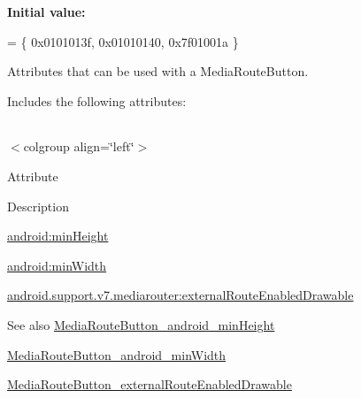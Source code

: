 {\bfseries Initial value\+:}
\begin{DoxyCode}
= \{
            0x0101013f, 0x01010140, 0x7f01001a
        \}
\end{DoxyCode}
Attributes that can be used with a Media\+Route\+Button. 

Includes the following attributes\+:

\tabulinesep=1mm
\begin{longtabu} spread 0pt [c]{*{0}{|X[-1]}|}
\hline
\end{longtabu}
$<$colgroup align=\char`\"{}left\char`\"{}$>$ 

Attribute

Description 

{\ttfamily \hyperlink{classandroid_1_1support_1_1v7_1_1mediarouter_1_1R_1_1styleable_ab98a55579c58d4c98bfd327310ce9a31}{android\+:min\+Height}}

{\ttfamily \hyperlink{classandroid_1_1support_1_1v7_1_1mediarouter_1_1R_1_1styleable_ab6856ae1a9a085cb912367dfb497084e}{android\+:min\+Width}}

{\ttfamily \hyperlink{classandroid_1_1support_1_1v7_1_1mediarouter_1_1R_1_1styleable_afdeb168461403af3e2f9cfe441938c4c}{android.\+support.\+v7.\+mediarouter\+:external\+Route\+Enabled\+Drawable}}

\begin{DoxySeeAlso}{See also}
\hyperlink{classandroid_1_1support_1_1v7_1_1mediarouter_1_1R_1_1styleable_ab98a55579c58d4c98bfd327310ce9a31}{Media\+Route\+Button\+\_\+android\+\_\+min\+Height} 

\hyperlink{classandroid_1_1support_1_1v7_1_1mediarouter_1_1R_1_1styleable_ab6856ae1a9a085cb912367dfb497084e}{Media\+Route\+Button\+\_\+android\+\_\+min\+Width} 

\hyperlink{classandroid_1_1support_1_1v7_1_1mediarouter_1_1R_1_1styleable_afdeb168461403af3e2f9cfe441938c4c}{Media\+Route\+Button\+\_\+external\+Route\+Enabled\+Drawable} 
\end{DoxySeeAlso}
\mbox{\label{classandroid_1_1support_1_1v7_1_1mediarouter_1_1R_1_1styleable_ab98a55579c58d4c98bfd327310ce9a31}} 
